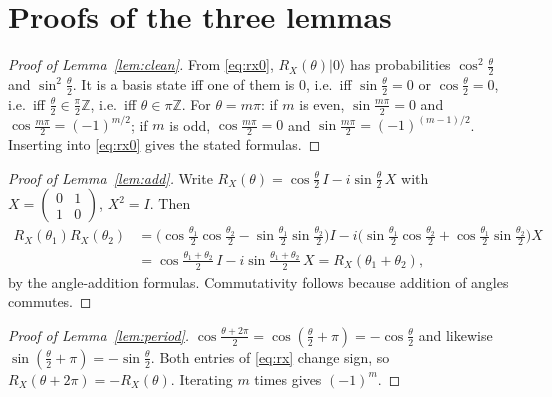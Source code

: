 \documentclass[11pt,a4paper]{article}
\newcommand{\ket}[1]{\lvert #1 \rangle}
\newcommand{\RX}{R_X}
\newcommand{\Z}{\mathbb{Z}}
\theoremstyle{plain}
\theoremstyle{definition}
\theoremstyle{remark}
\begin{document}
\section{Proofs of the three lemmas}\label{app:proofs}

\begin{proof}[Proof of Lemma~\ref{lem:clean}]
From \eqref{eq:rx0}, $\RX(\theta)\ket{0}$ has probabilities $\cos^2\frac{\theta}{2}$ and
$\sin^2\frac{\theta}{2}$. It is a basis state iff one of them is $0$, i.e.\ iff
$\sin\frac{\theta}{2} = 0$ or $\cos\frac{\theta}{2} = 0$, i.e.\ iff $\frac{\theta}{2}\in\frac{\pi}{2}\Z$,
i.e.\ iff $\theta\in\pi\Z$. For $\theta = m\pi$: if $m$ is even, $\sin\frac{m\pi}{2}=0$ and
$\cos\frac{m\pi}{2} = (-1)^{m/2}$; if $m$ is odd, $\cos\frac{m\pi}{2}=0$ and
$\sin\frac{m\pi}{2} = (-1)^{(m-1)/2}$. Inserting into \eqref{eq:rx0} gives the stated formulas.
\end{proof}

\begin{proof}[Proof of Lemma~\ref{lem:add}]
Write $\RX(\theta) = \cos\frac{\theta}{2}\,I - i\sin\frac{\theta}{2}\,X$ with
$X = \begin{pmatrix}0&1\\1&0\end{pmatrix}$, $X^2 = I$. Then
\begin{align*}
\RX(\theta_1)\RX(\theta_2)
&= \big(\cos\tfrac{\theta_1}{2}\cos\tfrac{\theta_2}{2} - \sin\tfrac{\theta_1}{2}\sin\tfrac{\theta_2}{2}\big) I
 - i\big(\sin\tfrac{\theta_1}{2}\cos\tfrac{\theta_2}{2} + \cos\tfrac{\theta_1}{2}\sin\tfrac{\theta_2}{2}\big) X\\
&= \cos\tfrac{\theta_1+\theta_2}{2}\, I - i \sin\tfrac{\theta_1+\theta_2}{2}\, X = \RX(\theta_1+\theta_2),
\end{align*}
by the angle-addition formulas. Commutativity follows because addition of angles commutes.
\end{proof}

\begin{proof}[Proof of Lemma~\ref{lem:period}]
$\cos\frac{\theta+2\pi}{2} = \cos(\frac{\theta}{2}+\pi) = -\cos\frac{\theta}{2}$ and likewise
$\sin(\frac{\theta}{2}+\pi) = -\sin\frac{\theta}{2}$. Both entries of \eqref{eq:rx} change sign,
so $\RX(\theta+2\pi) = -\RX(\theta)$. Iterating $m$ times gives $(-1)^m$.
\end{proof}

\end{document}
